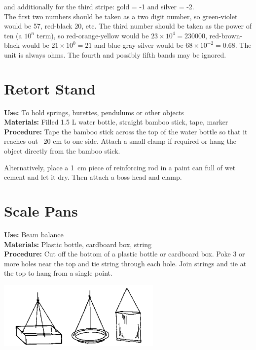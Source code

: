 \begin{multicols}{2}
\noindent and additionally for the third stripe: gold = -1 and silver = -2. \\

\noindent The first two numbers should be taken as a two digit number, so green-violet would be 57, red-black 20, etc. The third number should be taken as the power of ten (a $ 10^{n} $ term), so red-orange-yellow would be $ 23 \times 10^{4} = 230000 $, red-brown-black would be $ 21 \times 10^{0} = 21 $ and blue-gray-silver would be $ 68 \times 10^{-2} = 0.68 $. The unit is always ohms. The fourth and possibly fifth bands may be ignored.

\section{Retort Stand}
\label{sec:retort-stand}
\vspace{-10pt}
\textbf{Use:} To hold springs, burettes, pendulums or other objects\\
\textbf{Materials:} Filled 1.5 L water bottle, straight bamboo stick, tape, marker\\
\textbf{Procedure:} Tape the bamboo stick across the top of the water bottle so that it reaches out ~20 cm to one side. Attach a small clamp if required or hang the object directly from the bamboo stick.

Alternatively, place a 1~cm piece of reinforcing rod in a paint can full of wet cement and let it dry. Then attach a boss head and clamp.

\section{Scale Pans}
\label{sec:scale-pan}
\vspace{-10pt}
\textbf{Use:} Beam balance\\
\textbf{Materials:} Plastic bottle, cardboard box, string\\
\textbf{Procedure:} Cut off the bottom of a plastic bottle or cardboard box. Poke 3 or more holes near the top and tie string through each hole. Join strings and tie at the top to hang from a single point.
\begin{center}
\includegraphics[width=8cm]{./img/source/scale-pans.png}
\end{center}


\end{multicols}
